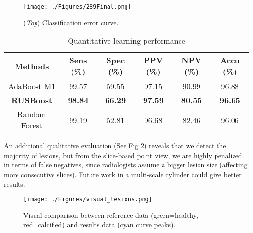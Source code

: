 \begin{figure}[ht]
	\centering
		\texttt{[image: ./Figures/289Final.png]}
	\caption[Classification Curve]{(\textit{Top}) Classification error curve.}
	\label{fig:errcurve}
\end{figure}


\begin{table*}[h]
\scriptsize
\caption{Quantitative learning performance}
\centering
\begin{tabular}{|c|c|c|c|c|c|}
\hline
\multicolumn{1}{|c|}{\textbf{Methods}} &\multicolumn{1}{c|}{\textbf{Sens (\%)}} &\multicolumn{1}{c|}{\textbf{Spec (\%)}} &\multicolumn{1}{c|}{\textbf{PPV (\%)}}&\multicolumn{1}{c|}{\textbf{NPV (\%)}}&\multicolumn{1}{c|}{\textbf{Accu (\%)}}\\
\hline
AdaBoost M1&99.57 &59.55 &97.15 &90.99 &96.88 \\
\textbf{RUSBoost} &\textbf{98.84} &\textbf{66.29} &\textbf{97.59} &\textbf{80.55} &\textbf{96.65}\\
Random Forest&99.19 &52.81 &96.68 &82.46 &96.06\\
\hline
\end{tabular}
\vspace{-0.3cm}
\label{tb:ml_res}
\normalsize
\end{table*}

An additional qualitative evaluation (See Fig \ref{fig:res_vis}) reveals that we detect the majority of lesions, but from the slice-based point view, we are highly penalized in terms of false negatives, since radiologists assume a bigger lesion size (affecting more consecutive slices). Future work in a multi-scale cylinder could give better results.
 
\begin{figure}[ht]
	\centering
		\texttt{[image: ./Figures/visual\_lesions.png]}
	\caption[Visual Assesment in Lesion Detection]{Visual comparison between reference data (green=healthy, red=calcified) and results data (cyan curve peaks).}
	\label{fig:res_vis}
\end{figure}